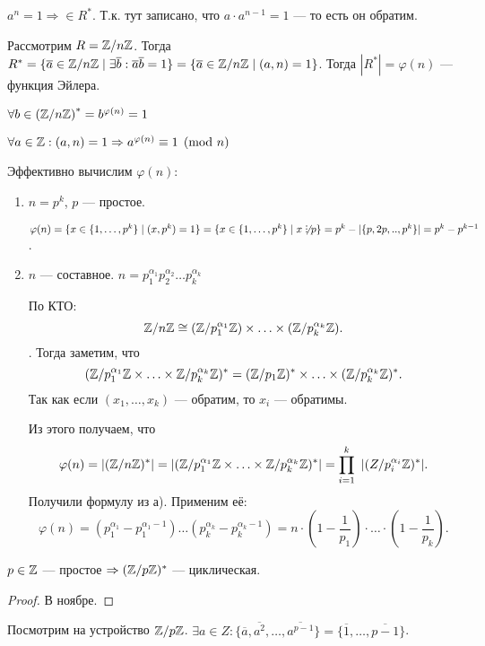 \begin{remark}
    $a^n = 1 \Rightarrow \in R^*$. Т.к. тут записано, что  $a \cdot a^{n-1} = 1$ --- то есть он обратим.
\end{remark}
\slashn
Рассмотрим $R = \mathbb{Z} / n\mathbb{Z}$. Тогда  $R^* = \{ \overline{a} \in \mathbb{Z} / n\mathbb{Z} \mid \exists \overline{b}: \overline{a} \overline{b} = 1\} = \{\overline{a} \in \mathbb{Z} / n\mathbb{Z} \mid (a, n) = 1\}$. Тогда $|R^*| = \varphi(n)$ --- функция Эйлера.
 \begin{theorem}
     $\forall b \in \left(\mathbb{Z} / n\mathbb{Z}\right)^* = b^{\varphi(n)} = 1$
\end{theorem}
\begin{theorem}
    $\forall a \in \mathbb{Z}: (a, n) = 1 \Rightarrow a^{\varphi(n)} \equiv 1 \pmod{n}$ 
\end{theorem}
\slashn
Эффективно вычислим $\varphi(n)$:
 \begin{enumerate}
     \item $n = p^k$, $p$ --- простое.

         $\varphi(n) = \{x \in \{1,\ldots,p^k\} \mid (x, p^k)=1\} = \{x \in \{1,\ldots, p^k\} \mid x \not \divby p\} = p^k - |\{p, 2p,..,p^k\}| = p^k - p^{k-1}$.
     \item $n$ --- составное. $n = p_1^{\alpha_1}p_2^{\alpha_2}\ldots p_k^{\alpha_k}$

         По КТО:  \[\mathbb{Z} / n\mathbb{Z} \cong (\mathbb{Z} / p_1^{\alpha_1} \mathbb{Z}) \times \ldots \times (\mathbb{Z} / p_k^{\alpha_k} \mathbb{Z}).\].
         Тогда заметим, что \[
             (\mathbb{Z} / p_1^{\alpha_1} \mathbb{Z} \times \ldots \times \mathbb{Z} / p_k^{\alpha_k} \mathbb{Z})^* = (\mathbb{Z} / p_1 \mathbb{Z})^* \times \ldots \times (\mathbb{Z} / p_k^{\alpha_k} \mathbb{Z})^*
         .\] Так как если $(x_1,\ldots,x_k)$ --- обратим, то $x_i$ --- обратимы.

         Из этого получаем, что  \[\varphi(n) = |(\mathbb{Z} / n\mathbb{Z})^*| = |(\mathbb{Z} / p_1^{\alpha_1} \mathbb{Z} \times \ldots \times \mathbb{Z} / p_k^{\alpha_k} \mathbb{Z})^*| = \prod_{i=1}^k\ |(Z / p_i^{\alpha_i} \mathbb{Z})^*|.\]
         Получили формулу из а). Применим её: \[
             \varphi(n) = (p_1^{\alpha_1} - p_1^{\alpha_1 - 1})\ldots(p_k^{\alpha_k} - p_k^{\alpha_k - 1}) = n \cdot (1 - \frac{1}{p_1})\cdot\ldots\cdot(1-\frac{1}{p_k})
         .\] 
 \end{enumerate}
 \begin{theorem}
     $p \in \mathbb{Z}$ --- простое  $\Rightarrow (\mathbb{Z} / p\mathbb{Z})^*$ --- циклическая.
 \end{theorem}
 \begin{proof}
     В ноябре.
 \end{proof}
 \slashn
 Посмотрим на устройство $\mathbb{Z} / p\mathbb{Z}$.  $\exists a \in Z: \{\overline{a}, \overline{a^2},\ldots,\overline{a^{p-1}}\} = \{\overline{1}, \ldots, \overline{p-1}\}$.

